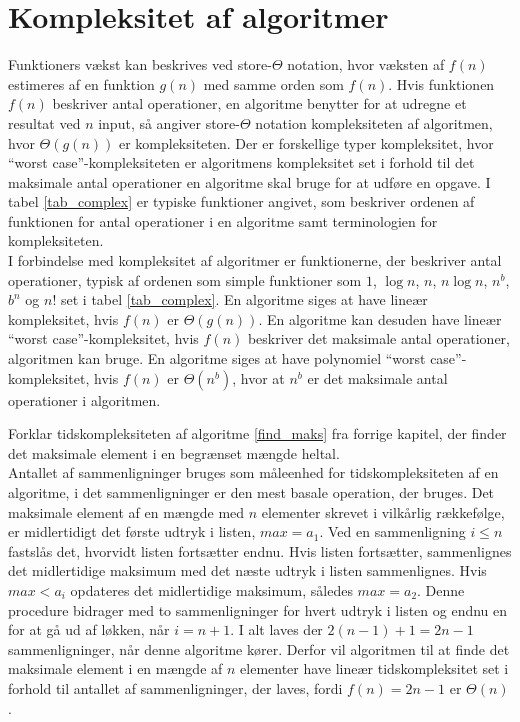 \section{Kompleksitet af algoritmer}
Funktioners vækst kan beskrives ved store-$\Theta$ notation, hvor væksten af $f(n)$ estimeres af en funktion $g(n)$ med samme orden som $f(n)$. 
Hvis funktionen $f(n)$ beskriver antal operationer, en algoritme benytter for at udregne et resultat ved $n$ input, så angiver store-$\Theta$ notation kompleksiteten af algoritmen, hvor $\Theta(g(n))$ er kompleksiteten. 
Der er forskellige typer kompleksitet, hvor “worst case”-kompleksiteten er algoritmens kompleksitet set i forhold til det maksimale antal operationer en algoritme skal bruge for at udføre en opgave.
I tabel \ref{tab_complex} er typiske funktioner angivet, som beskriver ordenen af funktionen for antal operationer i en algoritme samt terminologien for kompleksiteten.\\



I forbindelse med kompleksitet af algoritmer er funktionerne, der beskriver antal operationer, typisk af ordenen som simple funktioner som $1$, $\log n$, $n$, $n \log n$, $n^b$, $b^n$ og $n!$ set i tabel \ref{tab_complex}. 
En algoritme siges at have lineær kompleksitet, hvis $f(n)$ er $\Theta(g(n))$. 
En algoritme kan desuden have lineær “worst case”-kompleksitet, hvis $f(n)$ beskriver det maksimale antal operationer, algoritmen kan bruge. 
En algoritme siges at have polynomiel “worst case”-kompleksitet, hvis $f(n)$ er $\Theta(n^b)$, hvor at $n^b$ er det maksimale antal operationer i algoritmen.

\begin{exmp}
Forklar tidskompleksiteten af algoritme \ref{find_maks} fra forrige kapitel, der finder det maksimale element i en begrænset mængde heltal.\\ 
Antallet af sammenligninger bruges som måleenhed for tidskompleksiteten af en algoritme, i det sammenligninger er den mest basale operation, der bruges.
Det maksimale element af en mængde med $n$ elementer skrevet i vilkårlig rækkefølge, er midlertidigt det første udtryk i listen, $max=a_1$. 
Ved en sammenligning $i \leq n$ fastslås det, hvorvidt listen fortsætter endnu. Hvis listen fortsætter, sammenlignes det midlertidige maksimum med det næste udtryk i listen sammenlignes. 
Hvis $max<a_i$ opdateres det midlertidige maksimum, således $max=a_2$.
Denne procedure bidrager med to sammenligninger for hvert udtryk i listen og endnu en for at gå ud af løkken, når $i=n+1$. 
I alt laves der $2(n-1)+1=2n-1$ sammenligninger, når denne algoritme kører. 
Derfor vil algoritmen til at finde det maksimale element i en mængde af $n$ elementer have lineær tidskompleksitet set i forhold til antallet af sammenligninger, der laves, fordi $f(n)=2n-1$ er $\Theta (n)$.  
\end{exmp}
